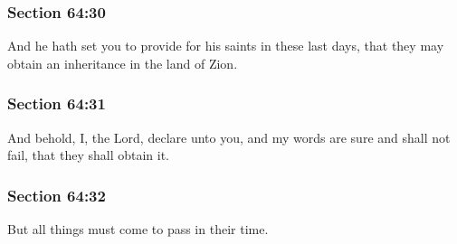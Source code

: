 
	\subsubsection{Section 64:30} %
		\label{DC64-30}

		And he hath set you to provide for his saints in these last days, that they may obtain an inheritance in the land of Zion.


	\subsubsection{Section 64:31} %
		\label{DC64-31}

		And behold, I, the Lord, declare unto you, and my words are sure and shall not fail, that they shall obtain it.


	\subsubsection{Section 64:32} %
		\label{DC64-32}

		But all things must come to pass in their time.

